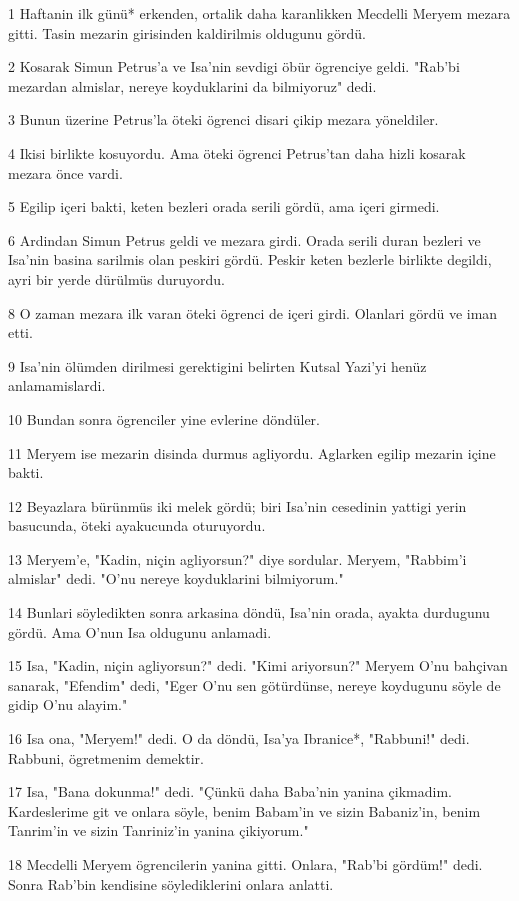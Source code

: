 \par 1 Haftanin ilk günü* erkenden, ortalik daha karanlikken Mecdelli Meryem mezara gitti. Tasin mezarin girisinden kaldirilmis oldugunu gördü.
\par 2 Kosarak Simun Petrus'a ve Isa'nin sevdigi öbür ögrenciye geldi. "Rab'bi mezardan almislar, nereye koyduklarini da bilmiyoruz" dedi.
\par 3 Bunun üzerine Petrus'la öteki ögrenci disari çikip mezara yöneldiler.
\par 4 Ikisi birlikte kosuyordu. Ama öteki ögrenci Petrus'tan daha hizli kosarak mezara önce vardi.
\par 5 Egilip içeri bakti, keten bezleri orada serili gördü, ama içeri girmedi.
\par 6 Ardindan Simun Petrus geldi ve mezara girdi. Orada serili duran bezleri ve Isa'nin basina sarilmis olan peskiri gördü. Peskir keten bezlerle birlikte degildi, ayri bir yerde dürülmüs duruyordu.
\par 8 O zaman mezara ilk varan öteki ögrenci de içeri girdi. Olanlari gördü ve iman etti.
\par 9 Isa'nin ölümden dirilmesi gerektigini belirten Kutsal Yazi'yi henüz anlamamislardi.
\par 10 Bundan sonra ögrenciler yine evlerine döndüler.
\par 11 Meryem ise mezarin disinda durmus agliyordu. Aglarken egilip mezarin içine bakti.
\par 12 Beyazlara bürünmüs iki melek gördü; biri Isa'nin cesedinin yattigi yerin basucunda, öteki ayakucunda oturuyordu.
\par 13 Meryem'e, "Kadin, niçin agliyorsun?" diye sordular. Meryem, "Rabbim'i almislar" dedi. "O'nu nereye koyduklarini bilmiyorum."
\par 14 Bunlari söyledikten sonra arkasina döndü, Isa'nin orada, ayakta durdugunu gördü. Ama O'nun Isa oldugunu anlamadi.
\par 15 Isa, "Kadin, niçin agliyorsun?" dedi. "Kimi ariyorsun?" Meryem O'nu bahçivan sanarak, "Efendim" dedi, "Eger O'nu sen götürdünse, nereye koydugunu söyle de gidip O'nu alayim."
\par 16 Isa ona, "Meryem!" dedi. O da döndü, Isa'ya Ibranice*, "Rabbuni!" dedi. Rabbuni, ögretmenim demektir.
\par 17 Isa, "Bana dokunma!" dedi. "Çünkü daha Baba'nin yanina çikmadim. Kardeslerime git ve onlara söyle, benim Babam'in ve sizin Babaniz'in, benim Tanrim'in ve sizin Tanriniz'in yanina çikiyorum."
\par 18 Mecdelli Meryem ögrencilerin yanina gitti. Onlara, "Rab'bi gördüm!" dedi. Sonra Rab'bin kendisine söylediklerini onlara anlatti.
